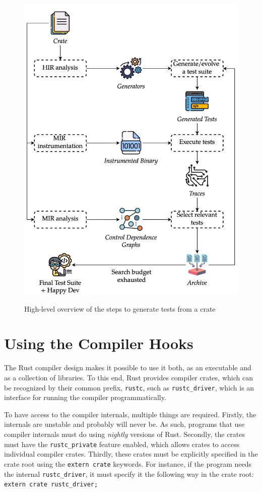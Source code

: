 \documentclass[paper=a4,%
  twoside,%
  BCOR4mm,%
  abstract=true,%
  toc=bibliography,%
  chapterprefix=true,%
  toc=bibliographynumbered,%
  open=right,%
  english,%
  pagesize=pdftex]{scrreprt}
\begin{document}
\begin{figure}[h!]
\caption{High-level overview of the steps to generate tests from a crate}
\centering
\includegraphics[width=\textwidth]{overview/overview-enhanced}
\label{fig:rustyunit-overview}
\end{figure}

\section{Using the Compiler Hooks}
The Rust compiler design makes it possible to use it both, as an executable and as a collection of libraries. To this end, Rust provides compiler crates, which can be recognized by their common prefix, \texttt{rustc}, such as \texttt{rustc\string_driver}, which is an interface for running the compiler programmatically.

To have access to the compiler internals, multiple things are required. Firstly, the internals are unstable and probably will never be. As such, programs that use compiler internals must do using \emph{nightly} versions of Rust. Secondly, the crates must have the \texttt{rustc\string_private} feature enabled, which allows crates to access individual compiler crates. Thirdly, these crates must be explicitly specified in the crate root using the \texttt{extern crate} keywords. For instance, if the program needs the internal \texttt{rustc\string_driver}, it must specify it the following way in the crate root: \texttt{extern crate rustc\string_driver;}
\end{document}
